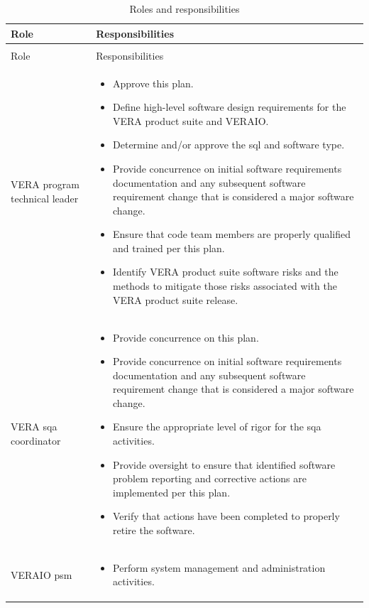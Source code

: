 \documentclass{vera-ornltm}
\begin{document}
\setcounter{table}{0}
\begin{longtable}{>{\raggedleft}p{}p{}}
\caption{Roles and responsibilities}\label{tab:roles}\\
\toprule
Role & Responsibilities \\
\midrule
\endfirsthead
\multicolumn{2}{c}{\tablename\ \thetable\ -- \textit{Continued from previous page}} \\
\toprule
Role & Responsibilities \\
\midrule
\endhead
VERA program technical leader &%
\begin{itemize}[topsep=0pt]
\item Approve this plan.
\item Define high-level software design requirements for the VERA product suite and VERAIO.
\item Determine and/or approve the \ac{sql} and software type.
\item Provide concurrence on initial software requirements documentation and any subsequent software requirement change that is considered a major software change.
\item Ensure that code team members are properly qualified and trained per this plan.
\item Identify VERA product suite software risks and the methods to mitigate those risks associated with the VERA product suite release.
\end{itemize} \\
\midrule
VERA \ac{sqa} coordinator &
\begin{itemize}[topsep=0pt]
\item Provide concurrence on this plan.
\item Provide concurrence on initial software requirements documentation and any subsequent software requirement change that is considered a major software change.
\item Ensure the appropriate level of rigor for the \ac{sqa} activities.
\item Provide oversight to ensure that identified software problem reporting and corrective actions are implemented per this plan.
\item Verify that actions have been completed to properly retire the software.
\end{itemize} \\
\midrule
VERAIO \ac{psm} &%
\begin{itemize}
\item Perform system management and administration activities.

\end{itemize}
\end{longtable}
\end{document}
